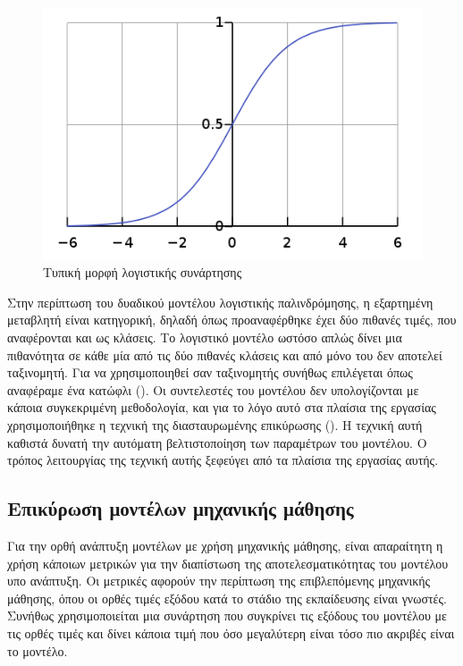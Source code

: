 \begin{figure}[!ht] \centering
\includegraphics[scale = 0.6]{static/figures/logistic_curve.png} 
\caption{Τυπική μορφή λογιστικής συνάρτησης \cite{10.1001/jama.2016.7653}}
\label{figure1.4}
\end{figure}

Στην περίπτωση του δυαδικού μοντέλου λογιστικής παλινδρόμησης, η εξαρτημένη μεταβλητή είναι
κατηγορική, δηλαδή όπως προαναφέρθηκε έχει δύο πιθανές τιμές, που αναφέρονται και ως κλάσεις.
Το λογιστικό μοντέλο ωστόσο απλώς δίνει μια πιθανότητα σε κάθε μία από τις δύο πιθανές
κλάσεις και από μόνο του δεν αποτελεί ταξινομητή. Για να χρησιμοποιηθεί σαν ταξινομητής
συνήθως επιλέγεται όπως αναφέραμε ένα κατώφλι (). Οι συντελεστές του μοντέλου
δεν υπολογίζονται με κάποια συγκεκριμένη μεθοδολογία, και για το λόγο αυτό στα πλαίσια της
εργασίας χρησιμοποιήθηκε η τεχνική της διασταυρωμένης επικύρωσης ().
Η τεχνική αυτή καθιστά δυνατή την αυτόματη βελτιστοποίηση των παραμέτρων του μοντέλου.
Ο τρόπος λειτουργίας της τεχνική αυτής ξεφεύγει από τα πλαίσια της εργασίας αυτής.

\subsection{Επικύρωση μοντέλων μηχανικής μάθησης}

Για την ορθή ανάπτυξη μοντέλων με χρήση μηχανικής μάθησης, είναι απαραίτητη η χρήση κάποιων
μετρικών για την διαπίστωση της αποτελεσματικότητας του μοντέλου υπο ανάπτυξη. Οι μετρικές
αφορούν την περίπτωση της επιβλεπόμενης μηχανικής μάθησης, όπου οι ορθές τιμές εξόδου 
κατά το στάδιο της εκπαίδευσης είναι γνωστές. Συνήθως χρησιμοποιείται μια συνάρτηση που 
συγκρίνει τις εξόδους του μοντέλου με τις ορθές τιμές και δίνει κάποια τιμή που όσο 
μεγαλύτερη είναι τόσο πιο ακριβές είναι το μοντέλο. 

